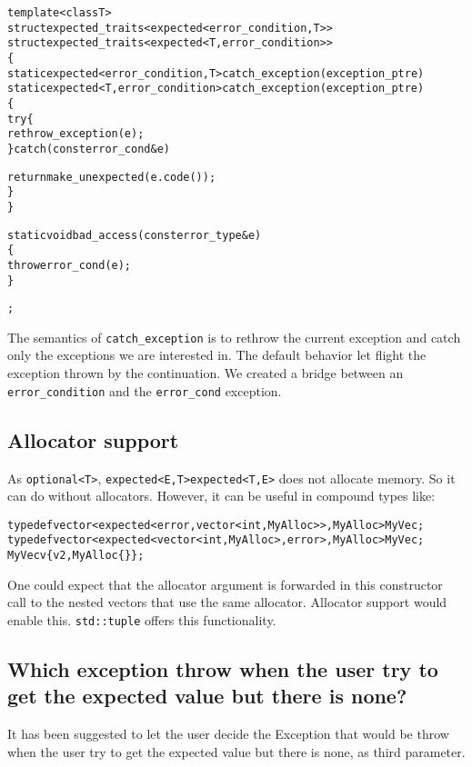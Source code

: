 \documentclass[a4paper,10pt]{article}
\newcommand{\cpp}[1]{\lstinline{#1}}
\newcommand{\suppress}[1]{\colorbox{suppress_color}{#1}}
\newcommand{\update}[1]{\colorbox{update_color}{#1}}
\begin{document}
\begin{alltt}
template <class T>
\suppress{struct expected_traits<expected<error_condition, T>>}
\update{struct expected_traits<expected<T, error_condition>>}
\{
\suppress{  static expected<error_condition, T> catch_exception(exception_ptr e)}
\update{  static expected<T, error_condition> catch_exception(exception_ptr e)}
  \{
    try\{
      rethrow_exception(e);
    \} catch(const error_cond& e) {
      return make_unexpected(e.code());
    \}
  \}

  static void bad_access(const error_type &e)
  \{
    throw error_cond(e);
  \}
};
\end{alltt}

The semantics of \cpp{catch_exception} is to rethrow the current exception and catch only the exceptions we are interested in. The default behavior let flight the exception thrown by the continuation. We created a bridge between an \cpp{error_condition} and the \cpp{error_cond} exception.

\subsection{Allocator support}

As \cpp{optional<T>},  \suppress{\cpp{expected<E,T>}}\update{\cpp{expected<T,E>}} does not allocate memory. So it can do without allocators. However, it can be useful in compound types like:

\begin{alltt}
\suppress{typedef vector<expected<error, vector<int, MyAlloc>>, MyAlloc> MyVec;}
\update{typedef vector<expected<vector<int, MyAlloc>, error>, MyAlloc> MyVec;}
MyVec v\{ v2, MyAlloc\{\} \};
\end{alltt}

\noindent
One could expect that the allocator argument is forwarded in this constructor call to the nested vectors that use the same allocator. Allocator support would enable this. \cpp{std::tuple} offers this functionality.

\subsection{Which exception throw when the user try to get the expected value but there is none?}

It has been suggested to let the user decide the Exception that would be throw when the user try to get the expected value but there is none, as third parameter. 
\end{document}
